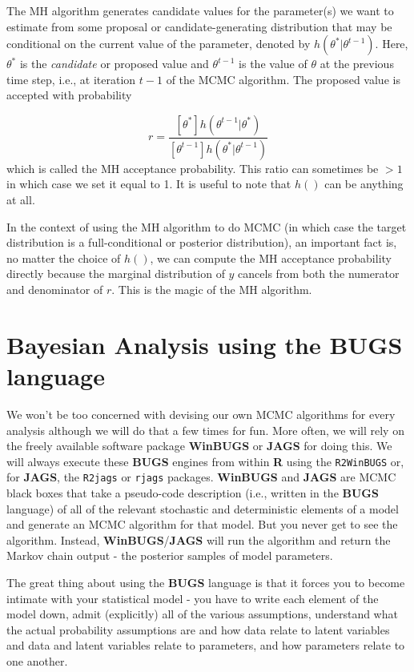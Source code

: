 The MH algorithm generates candidate values for the parameter(s) we want to estimate from some
proposal or candidate-generating distribution that may be conditional
on the current value of the parameter, denoted by
$h(\theta^{*}|\theta^{t-1})$. Here, $\theta^{*}$ is the {\it candidate}
or proposed
value and $\theta^{t-1}$ is the value of $\theta$ at the previous time step, i.e., at iteration $t-1$ of
the MCMC algorithm.  The proposed value
is accepted with probability

\[
r = \frac{ [\theta^{*}] h(\theta^{t-1}|\theta^{*})}
    { [\theta^{t-1}] h(\theta^{*}|\theta^{t-1}) }
\]
which is called the MH acceptance probability.
This ratio can sometimes be $>1$ in which case we set it equal to
1. It is useful to note that $h()$ can be anything at all. 

In the context of using the MH algorithm to do MCMC (in which case
the target distribution is a full-conditional or posterior distribution), an
important fact is, no matter
the choice of $h()$, we can compute the MH acceptance probability
directly because 
the marginal distribution of $y$ cancels from both the numerator and
denominator of $r$. This is the magic of the MH algorithm.


\section{Bayesian Analysis using the BUGS language}

We won't be too concerned with devising our own MCMC algorithms for
every analysis
although we will do that a few times for fun.  More often, we
will rely on the freely available software package {\bf WinBUGS} or
{\bf JAGS}
for doing this.  We will always execute these {\bf BUGS} engines from
within {\bf R} using the \mbox{\tt R2WinBUGS} \citep{sturtz_etal:2005}
or, for {\bf JAGS}, the  \mbox{\tt R2jags} \citep{su_yajima:2011} or 
\mbox{\tt rjags} \citep{plummer:2009} packages. 
{\bf WinBUGS} and {\bf JAGS} are  MCMC black boxes
that take a pseudo-code description (i.e., written in the {\bf BUGS}
language) of all of the relevant stochastic
and deterministic elements of a model and generate an MCMC algorithm
for that model. But you never get to see the algorithm. Instead,
{\bf WinBUGS}/{\bf JAGS} will run the 
algorithm and  return the Markov chain output
- the posterior samples of model parameters.

The great thing about using the {\bf BUGS} language is that it forces
you to become intimate with your statistical model - you have to write
each element of the model down, admit (explicitly) all of the various
assumptions, understand what the actual probability assumptions are
and how data relate to latent variables and data and latent variables
relate to parameters, and how parameters relate to one another.

